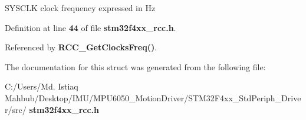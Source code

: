 S\+Y\+S\+C\+LK clock frequency expressed in Hz 

Definition at line \textbf{ 44} of file \textbf{ stm32f4xx\+\_\+rcc.\+h}.



Referenced by \textbf{ R\+C\+C\+\_\+\+Get\+Clocks\+Freq()}.



The documentation for this struct was generated from the following file\+:\begin{DoxyCompactItemize}
\item 
C\+:/\+Users/\+Md. Istiaq Mahbub/\+Desktop/\+I\+M\+U/\+M\+P\+U6050\+\_\+\+Motion\+Driver/\+S\+T\+M32\+F4xx\+\_\+\+Std\+Periph\+\_\+\+Driver/src/\textbf{ stm32f4xx\+\_\+rcc.\+h}\end{DoxyCompactItemize}
